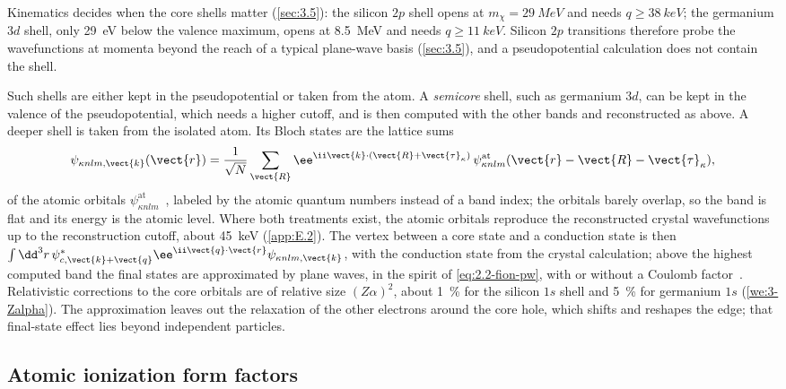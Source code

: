 Kinematics decides when the core shells matter (\cref{sec:3.5}): the silicon $2p$ shell opens at $m_\chi = \SI{29}{MeV}$ and needs $q \ge \SI{38}{keV}$; the germanium $3d$ shell, only \SI{29}{eV} below the valence maximum, opens at \SI{8.5}{MeV} and needs $q \ge \SI{11}{keV}$. Silicon $2p$ transitions therefore probe the wavefunctions at momenta beyond the reach of a typical plane-wave basis (\cref{sec:3.5}), and a pseudopotential calculation does not contain the shell.

Such shells are either kept in the pseudopotential or taken from the atom. A \emph{semicore} shell, such as germanium $3d$, can be kept in the valence of the pseudopotential, which needs a higher cutoff, and is then computed with the other bands and reconstructed as above. A deeper shell is taken from the isolated atom. Its Bloch states are the lattice sums
\begin{equation}
  \psi_{\kappa nlm,\vect{k}}(\vect{r}) = \frac{1}{\sqrt N}\sum_{\vect{R}}\ee^{\ii\vect{k}\cdot(\vect{R}+\vect{\tau}_\kappa)}\,\psi^{\mathrm{at}}_{\kappa nlm}(\vect{r} - \vect{R} - \vect{\tau}_\kappa) ,
  \label{eq:E.7-core}
\end{equation}
of the atomic orbitals $\psi^{\mathrm{at}}_{\kappa nlm}$~\cite[Eq.~(2.8)]{griffin2021extended}, labeled by the atomic quantum numbers instead of a band index; the orbitals barely overlap, so the band is flat and its energy is the atomic level. Where both treatments exist, the atomic orbitals reproduce the reconstructed crystal wavefunctions up to the reconstruction cutoff, about \SI{45}{keV} (\cref{app:E.2}). The vertex between a core state and a conduction state is then $\int\dd^3r\,\psi^*_{c,\vect{k}+\vect{q}}\ee^{\ii\vect{q}\cdot\vect{r}}\psi_{\kappa nlm,\vect{k}}$, with the conduction state from the crystal calculation; above the highest computed band the final states are approximated by plane waves, in the spirit of \cref{eq:2.2-fion-pw}, with or without a Coulomb factor~\cite[Sects.~2.3 and~3.4]{griffin2021extended}. Relativistic corrections to the core orbitals are of relative size $(Z\alpha)^2$, about \SI{1}{\percent} for the silicon $1s$ shell and \SI{5}{\percent} for germanium $1s$ (\cref{we:3-Zalpha}). The approximation leaves out the relaxation of the other electrons around the core hole, which shifts and reshapes the edge; that final-state effect lies beyond independent particles.

\subsection{Atomic ionization form factors}

